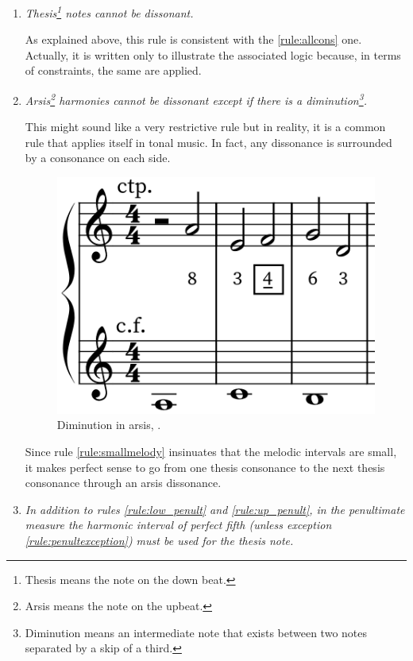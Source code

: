 \begin{enumerate}[wide, label=\bfseries 2.H\arabic*]
    \item\label{rule:consthesis} \textit{Thesis\footnote{Thesis means the note on the down beat.} notes cannot be dissonant.} \textcite[p.64]{GaPFr}
    
    As explained above, this rule is consistent with the \ref{rule:allcons} one. Actually, it is written only to illustrate the associated logic because, in terms of constraints, the same are applied.

    \item\label{rule:arsisdim} \textit{Arsis\footnote{Arsis means the note on the upbeat.} harmonies cannot be dissonant except if there is a diminution\footnote{Diminution means an intermediate note that exists between two notes separated by a skip of a third.}.} \parencite[p.64]{GaPFr} 

    This might sound like a very restrictive rule but in reality, it is a common rule that applies itself in tonal music. In fact, any dissonance is surrounded by a consonance on each side.
    \begin{figure}[h]
        \centering
        \includegraphics[height=\fh]{Images/diminution_arsis.png}
        \caption{Diminution in arsis, .}
        \label{fig:diminutionarsis}
    \end{figure}

    Since rule \ref{rule:smallmelody} insinuates that the melodic intervals are small, it makes perfect sense to go from one thesis consonance to the next thesis consonance through an arsis dissonance.

    \item\label{rule:penult2nd} \textit{In addition to rules \ref{rule:low_penult} and \ref{rule:up_penult}, in the penultimate measure the harmonic interval of perfect fifth (unless exception \ref{rule:penultexception}) must be used for the thesis note.} \parencite[p.64-65]{GaPFr}


\end{enumerate}
